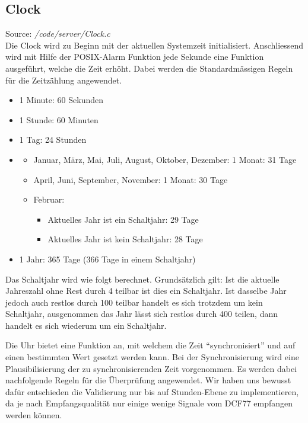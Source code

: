 \subsection{Clock}
Source: \textit{/code/server/Clock.c}\\
Die Clock wird zu Beginn mit der aktuellen Systemzeit initialisiert. Anschliessend wird mit Hilfe der POSIX-Alarm Funktion jede Sekunde eine Funktion ausgeführt, welche die Zeit erhöht. Dabei werden die Standardmässigen Regeln für die Zeitzählung angewendet.
\begin{itemize}
\item 1 Minute: 60 Sekunden
\item 1 Stunde: 60 Minuten
\item 1 Tag: 24 Stunden
\item 
\begin{itemize}
\item Januar, März, Mai, Juli, August, Oktober, Dezember: 1 Monat: 31 Tage 
\item April, Juni, September, November: 1 Monat: 30 Tage
\item Februar:
\begin{itemize}
\item Aktuelles Jahr ist ein Schaltjahr: 29 Tage 
\item Aktuelles Jahr ist kein Schaltjahr: 28 Tage
\end{itemize}
\end{itemize}
\item 1 Jahr: 365 Tage (366 Tage in einem Schaltjahr)
\end{itemize}

Das Schaltjahr wird wie folgt berechnet. Grundsätzlich gilt: Ist die aktuelle Jahreszahl ohne Rest durch 4 teilbar ist dies ein Schaltjahr. Ist dasselbe Jahr jedoch auch restlos durch 100 teilbar handelt es sich trotzdem um kein Schaltjahr, ausgenommen das Jahr lässt sich restlos durch 400 teilen, dann handelt es sich wiederum um ein Schaltjahr.

Die Uhr bietet eine Funktion an, mit welchem die Zeit "`synchronisiert"' und auf einen bestimmten Wert gesetzt werden kann. Bei der Synchronisierung wird eine Plausibilisierung der zu synchronisierenden Zeit vorgenommen. Es werden dabei nachfolgende Regeln für die Überprüfung angewendet. Wir haben uns bewusst dafür entschieden die Validierung nur bis auf Stunden-Ebene zu implementieren, da je nach Empfangsqualität nur einige wenige Signale vom DCF77 empfangen werden können.

